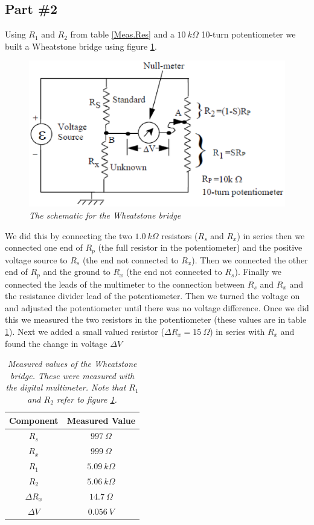 \documentclass[11pt]{article}
\numberwithin{equation}{section}
\begin{document}
\subsection{Part \#2}
Using $R_1$ and $R_2$ from table \ref{Meas.Res} and a $10\ k\Omega$ 10-turn potentiometer we built a Wheatstone bridge using figure \ref{Wbridge}. 
\begin{figure}[h]
\begin{center}
\includegraphics[scale=0.65]{WheatBridge.eps}
\caption{\textit{The schematic for the Wheatstone bridge}}
\label{Wbridge}
\end{center}
\end{figure}
We did this by connecting the two $1.0\ k\Omega$ resistors ($R_s$ and $R_x$) in series then we connected one end of $R_p$ (the full resistor in the potentiometer) and the positive voltage source to $R_s$ (the end not connected to $R_x$). Then we connected the other end of $R_p$ and the ground to $R_x$ (the end not connected to $R_s$). Finally we connected the leads of the multimeter to the connection between $R_s$ and $R_x$ and the resistance divider lead of the potentiometer. Then we turned the voltage on and adjusted the potentiometer until there was no voltage difference. Once we did this we measured the two resistors in the potentiometer (these values are in table \ref{Values}). Next we added a small valued resistor ($\Delta R_x = 15\ \Omega$) in series with $R_x$ and found the change in voltage $\Delta V$
\begin{table}[h]
\begin{center}
\begin{tabular}{c|c}
Component	&Measured Value\\
\hline
$R_s$		&$997\ \Omega$\\
$R_x$		&$999\ \Omega$\\
$R_1$		&$5.09\ k\Omega$\\
$R_2$		&$5.06\ k\Omega$\\
\hline
$\Delta R_x$	&$14.7\ \Omega$\\
$\Delta V$	&$0.056\ V$
\end{tabular}
\caption{\textit{Measured values of the Wheatstone bridge. These were measured with the digital multimeter. Note that $R_1$ and $R_2$ refer to figure \ref{Wbridge}.}}
\label{Values}
\end{center}
\end{table}
\end{document}
